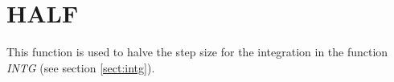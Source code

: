 \section{HALF}
\label{sect:half}

\noindent This function is used to halve the step size for the integration
in the function {\em INTG} (see section \ref{sect:intg}).\\
